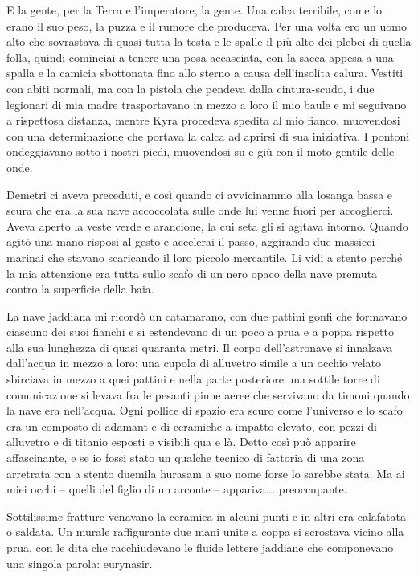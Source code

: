 E la gente, per la Terra e l'imperatore, la gente. Una calca terribile,
come lo erano il suo peso, la puzza e il rumore che produceva. Per una
volta ero un uomo alto che sovrastava di quasi tutta la testa e le
spalle il più alto dei plebei di quella folla, quindi cominciai a tenere
una posa accasciata, con la sacca appesa a una spalla e la camicia
sbottonata fino allo sterno a causa dell'insolita calura. Vestiti con
abiti normali, ma con la pistola che pendeva dalla cintura-scudo, i due
legionari di mia madre trasportavano in mezzo a loro il mio baule e mi
seguivano a rispettosa distanza, mentre Kyra procedeva spedita al mio
fianco, muovendosi con una determinazione che portava la calca ad
aprirsi di sua iniziativa. I pontoni ondeggiavano sotto i nostri piedi,
muovendosi su e giù con il moto gentile delle onde.

Demetri ci aveva preceduti, e così quando ci avvicinammo alla losanga
bassa e scura che era la sua nave accoccolata sulle onde lui venne fuori
per accoglierci. Aveva aperto la veste verde e arancione, la cui seta
gli si agitava intorno. Quando agitò una mano risposi al gesto e
accelerai il passo, aggirando due massicci marinai che stavano
scaricando il loro piccolo mercantile. Li vidi a stento perché la mia
attenzione era tutta sullo scafo di un nero opaco della nave premuta
contro la superficie della baia.

La nave jaddiana mi ricordò un catamarano, con due pattini gonfi che
formavano ciascuno dei suoi fianchi e si estendevano di un poco a prua e
a poppa rispetto alla sua lunghezza di quasi quaranta metri. Il corpo
dell'astronave si innalzava dall'acqua in mezzo a loro: una cupola di
alluvetro simile a un occhio velato sbirciava in mezzo a quei pattini e
nella parte posteriore una sottile torre di comunicazione si levava fra
le pesanti pinne aeree che servivano da timoni quando la nave era
nell'acqua. Ogni pollice di spazio era scuro come l'universo e lo scafo
era un composto di adamant e di ceramiche a impatto elevato, con pezzi
di alluvetro e di titanio esposti e visibili qua e là. Detto così può
apparire affascinante, e se io fossi stato un qualche tecnico di
fattoria di una zona arretrata con a stento duemila hurasam a suo nome
forse lo sarebbe stata. Ma ai miei occhi -- quelli del figlio di un
arconte -- appariva... preoccupante.

Sottilissime fratture venavano la ceramica in alcuni punti e in altri
era calafatata o saldata. Un murale raffigurante due mani unite a coppa
si scrostava vicino alla prua, con le dita che racchiudevano le fluide
lettere jaddiane che componevano una singola parola:
\foreignlanguage{italian}{eurynasir}\emph{.}

